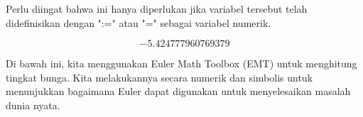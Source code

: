 \documentclass[a4paper,10pt]{article}
\begin{document}
\begin{eulernotebook}
\begin{eulercomment}
\begin{eulercomment}
\begin{eulercomment}
\begin{eulercomment}
\begin{eulercomment}
\begin{eulercomment}
\begin{eulercomment}
\begin{eulercomment}
\begin{eulercomment}
Perlu diingat bahwa ini hanya diperlukan jika variabel tersebut telah
didefinisikan dengan ":=" atau "=" sebagai variabel numerik.
\end{eulercomment}
\begin{eulerformula}
\[
-5.424777960769379
\]
\end{eulerformula}
\begin{eulercomment}
\begin{eulercomment}
\begin{eulercomment}
Di bawah ini, kita menggunakan Euler Math Toolbox (EMT) untuk
menghitung tingkat bunga. Kita melakukannya secara numerik dan
simbolis untuk menunjukkan bagaimana Euler dapat digunakan untuk
menyelesaikan masalah dunia nyata.


\end{eulercomment}
\end{eulercomment}
\end{eulercomment}
\end{eulercomment}
\end{eulercomment}
\end{eulercomment}
\end{eulercomment}
\end{eulercomment}
\end{eulercomment}
\end{eulercomment}
\end{eulercomment}
\end{eulernotebook}
\end{document}
